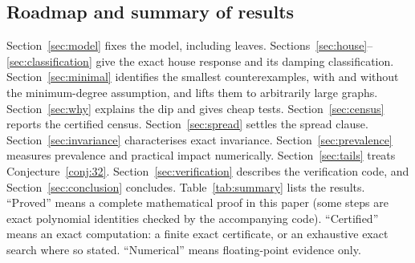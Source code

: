 \documentclass[11pt,a4paper]{article}
\theoremstyle{definition}\newtheorem{conjecture}{Conjecture}
\theoremstyle{remark}\newtheorem{remark}[theorem]{Remark}
\begin{document}
\subsection{Roadmap and summary of results}
Section~\ref{sec:model} fixes the model, including leaves. Sections~\ref{sec:house}--\ref{sec:classification} give the exact house response and its damping classification. Section~\ref{sec:minimal} identifies the smallest counterexamples, with and without the minimum-degree assumption, and lifts them to arbitrarily large graphs. Section~\ref{sec:why} explains the dip and gives cheap tests. Section~\ref{sec:census} reports the certified census. Section~\ref{sec:spread} settles the spread clause. Section~\ref{sec:invariance} characterises exact invariance. Section~\ref{sec:prevalence} measures prevalence and practical impact numerically. Section~\ref{sec:tails} treats Conjecture~\ref{conj:32}. Section~\ref{sec:verification} describes the verification code, and Section~\ref{sec:conclusion} concludes. Table~\ref{tab:summary} lists the results. ``Proved'' means a complete mathematical proof in this paper (some steps are exact polynomial identities checked by the accompanying code). ``Certified'' means an exact computation: a finite exact certificate, or an exhaustive exact search where so stated. ``Numerical'' means floating-point evidence only.
\end{document}
